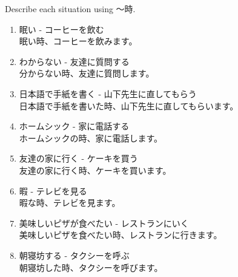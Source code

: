 \documentclass[notoc,notitlepage]{tufte-book}
\begin{document}
\begin{ex}
  Describe each situation using 〜時.

  \begin{enumerate}
    \item 眠い - コーヒーを飲む \\
      眠い時、コーヒーを飲みます。
    \item わからない - 友達に質問する \\
      分からない時、友達に質問します。
    \item 日本語で手紙を書く - 山下先生に直してもらう \\
      日本語で手紙を書いた時、山下先生に直してもらいます。
    \item ホームシック - 家に電話する \\
      ホームシックの時、家に電話します。
    \item 友達の家に行く - ケーキを買う \\
      友達の家に行く時、ケーキを買います。
    \item 暇 - テレビを見る \\
      暇な時、テレビを見ます。
    \item 美味しいピザが食べたい - レストランにいく \\
      美味しいピザを食べたい時、レストランに行きます。
    \item 朝寝坊する - タクシーを呼ぶ \\
      朝寝坊した時、タクシーを呼びます。
  \end{enumerate}
\end{ex}
\end{document}
